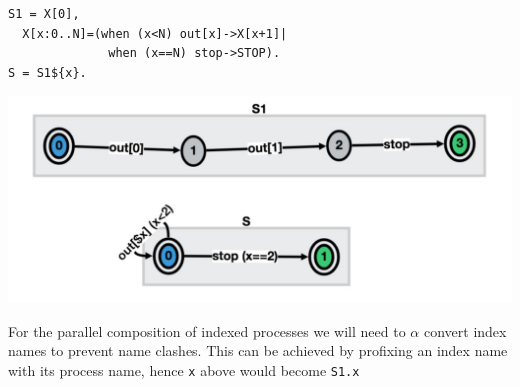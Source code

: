 \documentclass[]{article}
\begin{document}
\begin{minipage}{0.55\textwidth}
\begin{verbatim}
S1 = X[0],
  X[x:0..N]=(when (x<N) out[x]->X[x+1]|
              when (x==N) stop->STOP).
S = S1${x}.
   \end{verbatim}
\end{minipage}\begin{minipage}{0.4\textwidth}
\begin{center}\includegraphics[scale=0.2]{VarBug.jpg}\end{center}
\end{minipage}



For the parallel composition of indexed processes we will need to $\alpha$ convert index names to prevent name clashes. This can be achieved by profixing an index name with its process name, hence \verb|x| above would become \verb|S1.x|
\end{document}
